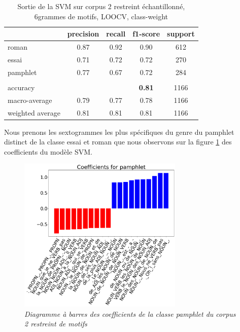 \begin{table}[H]
    \centering 
    \begin{tabular}{l c c c c}
        \toprule
             & precision & recall & f1-score & support \\
        \toprule
        \midrule
        roman & 0.87 & 0.92 & 0.90 & 612 \\
        \midrule
        essai & 0.71 & 0.72 & 0.72 & 270\\
        \midrule
        pamphlet & 0.77 & 0.67 & 0.72 & 284\\
        \midrule
        & & & & \\
        \midrule
        accuracy & & & \textbf{0.81} & 1166 \\
        \midrule
        macro-average & 0.79 & 0.77 & 0.78 & 1166\\
        \midrule
        weighted average & 0.81 & 0.81 & 0.81 & 1166\\

        \bottomrule
    \end{tabular}
\caption{Sortie de la SVM sur corpus 2 restreint échantillonné, 6grammes de motifs, LOOCV, class-weight}
\label{'tab:SVMcorpus2restreint'}
\end{table} 
Nous prenons les sextogrammes les plus spécifiques du genre du pamphlet distinct de la classe essai et roman que nous observons sur la figure \ref{'fig:coefs_pamphlet_corpus2restreint'} des coefficients du modèle SVM. 

\begin{figure}[H]
\centering %
\includegraphics[width=0.70\textwidth]{img/coefs_pamphlet_corpus2restreint.png}
\caption{\textit{Diagramme à barres des coefficients de la classe pamphlet du corpus 2 restreint de motifs}}
\label{'fig:coefs_pamphlet_corpus2restreint'}
\end{figure}

